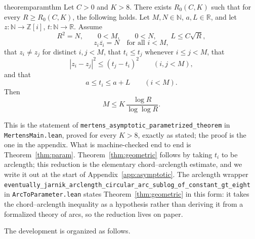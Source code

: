 \documentclass[11pt]{article}
\newcommand{\N}{\mathbb N}
\newcommand{\R}{\mathbb R}
\newcommand{\GI}{\mathbb Z[i]}
\newcommand{\conj}[1]{\overline{#1}}
\begin{document}
\begin{restatable}{theorem}{paramthm}\label{thm:param}
Let \(C>0\) and \(K>8\).
There exists \(R_0(C,K)\) such that for every \(R\ge R_0(C,K)\), the following holds.
Let \(M,N\in\N\), \(a,L\in\R\), and let \(z:\N\to\GI\), \(t:\N\to\R\).
Assume
\[
  R^2=N,\qquad 0<M,\qquad 0<N,\qquad L\le C\sqrt R,
\]
\[
  z_i\conj{z_i}=N\quad\text{for all }i<M,
\]
that \(z_i\ne z_j\) for distinct \(i,j<M\), that \(t_i\le t_j\) whenever \(i\le j<M\), that
\[
  |z_i-z_j|^2\le (t_j-t_i)^2\qquad (i,j<M),
\]
and that
\[
  a\le t_i\le a+L\qquad (i<M).
\]
Then
\[
  M\le K\,\frac{\log R}{\log\log R}.
\]
\end{restatable}

This is the statement of \texttt{mertens\_asymptotic\_parametrized\_theorem} in \texttt{MertensMain.lean}, proved for every \(K>8\), exactly as stated; the proof is the one in the appendix.
What is machine-checked end to end is Theorem~\ref{thm:param}.
Theorem~\ref{thm:geometric} follows by taking \(t_i\) to be arclength; this reduction is the elementary chord--arclength estimate, and we write it out at the start of Appendix~\ref{app:asymptotic}.
The arclength wrapper\\
\texttt{eventually\_jarnik\_arclength\_circular\_arc\_sublog\_of\_constant\_gt\_eight}\\
in \texttt{ArcToParameter.lean} states Theorem~\ref{thm:geometric} in this form: it takes the chord--arclength inequality as a hypothesis rather than deriving it from a formalized theory of arcs, so the reduction lives on paper.

The development is organized as follows.
\end{document}
